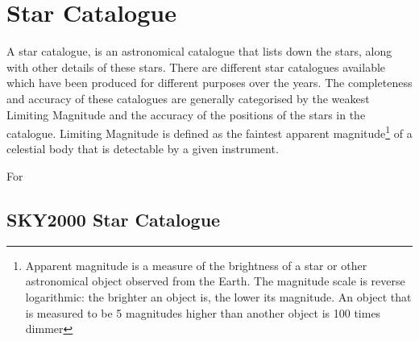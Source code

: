 \documentclass[../../main.tex]{subfiles}
\begin{document}
\section{Star Catalogue}
\label{appendix:star_catalogue}
\thispagestyle{fancy}


A star catalogue, is an astronomical catalogue that lists down the stars, along with other details of these stars.
There are different star catalogues available which have been produced for different purposes over the years.
The completeness and accuracy of these catalogues are generally categorised by the weakest Limiting Magnitude and the accuracy of the positions of the stars in the catalogue. 
Limiting Magnitude is defined as the faintest apparent magnitude\footnote{Apparent magnitude is a measure of the brightness of a star or other astronomical object observed from the Earth. The magnitude scale is reverse logarithmic: the brighter an object is, the lower its magnitude. An object that is measured to be 5 magnitudes higher than another object is 100 times dimmer} of a celestial body that is detectable by a given instrument.

For 

\subsection{SKY2000 Star Catalogue}



\end{document}
